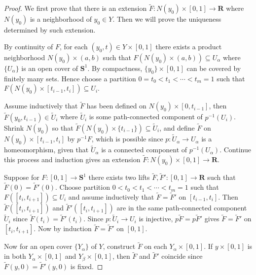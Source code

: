 \documentclass[11pt]{article}
\theoremstyle{definition}
\theoremstyle{plain}
\theoremstyle{remark}
\newcommand{\R}{\mathbf{R}}
\begin{document}
\begin{proof}
We first prove that there is an extension $\widetilde{F}:N(y_0)\times[0,1]\to\R$ where $N(y_0)$ is a neighborhood of $y_0\in Y$. Then we will prove the uniqueness determined by such extension.\medbreak

By continuity of $F$, for each $(y_0,t)\in Y\times[0,1]$ there exists a product neighborhood $N(y_0)\times(a,b)$ such that $F(N(y_0)\times(a,b))\subseteq U_\alpha$ where $\{U_\alpha\}$ is an open cover of $\mathbf{S}^1$. By compactness, $\{y_0\}\times[0,1]$ can be covered by finitely many sets. Hence choose a partition $0=t_0<t_1<\cdots<t_m=1$ such that $F(N(y_0)\times[t_{i-1},t_i])\subseteq U_i$.\medbreak

Assume inductively that $\widetilde{F}$ has been defined on $N(y_0)\times[0,t_{i-1}]$, then $\widetilde{F}(y_0,t_{i-1})\in\widetilde{U}_i$ where $\widetilde{U}_i$ is some path-connected component of $p^{-1}(U_i)$. Shrink $N(y_0)$ so that $\widetilde{F}(N(y_0)\times\{t_{i-1}\})\subseteq\widetilde{U}_i$, and define $\widetilde{F}$ on $N(y_0)\times[t_{i-1},t_i]$ by $p^{-1}F$, which is possible since $p:\widetilde{U}_\alpha\to U_\alpha$ is a homeomorphism, given that $\widetilde{U}_\alpha$ is a connected component of $p^{-1}(U_\alpha)$. Continue this process and induction gives an extension $\widetilde{F}:N(y_0)\times[0,1]\to\R$.\medbreak

Suppose for $F:[0,1]\to\mathbf{S}^1$ there exists two lifts $\widetilde{F},\widetilde{F}':[0,1]\to\R$ such that $\widetilde{F}(0)=\widetilde{F}'(0)$. Choose partition $0<t_0<t_1<\cdots<t_m=1$ such that $F([t_i,t_{i+1}])\subseteq U_i$ and assume inductively that $\widetilde{F}=\widetilde{F}'$ on $[t_{i-1},t_i]$. Then $\widetilde{F}([t_i,t_{i+1}])$ and $\widetilde{F}'([t_i,t_{i+1}])$ are in the same path-connected component $\widetilde{U}_i$ since $\widetilde{F}(t_i)=\widetilde{F}'(t_i)$. Since $p:\widetilde{U}_i\to U_i$ is injective, $p\widetilde{F}=p\widetilde{F}'$ gives $\widetilde{F}=\widetilde{F}'$ on $[t_i,t_{i+1}]$. Now by induction $\widetilde{F}=\widetilde{F}'$ on $[0,1]$.\medbreak

Now for an open cover $\{Y_\alpha\}$ of $Y$, construct $\widetilde{F}$ on each $Y_\alpha\times[0,1]$. If $y\times[0,1]$ is in both $Y_\alpha\times[0,1]$ and $Y_\beta\times[0,1]$, then $\widetilde{F}$ and $\widetilde{F}'$ coincide since $\widetilde{F}(y,0)=\widetilde{F}'(y,0)$ is fixed.
\end{proof}
\end{document}
